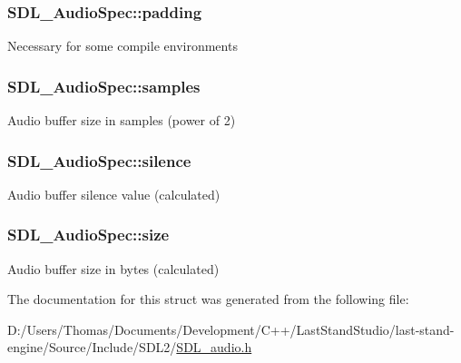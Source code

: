 \subsubsection[{padding}]{ S\+D\+L\+\_\+\+Audio\+Spec\+::padding}\label{structSDL__AudioSpec_a738371fc13b54cefef4db16994abeeb6}
Necessary for some compile environments \hypertarget{structSDL__AudioSpec_a2cdf5e885808c10bfa2810b706e69f95}{}
\subsubsection[{samples}]{ S\+D\+L\+\_\+\+Audio\+Spec\+::samples}\label{structSDL__AudioSpec_a2cdf5e885808c10bfa2810b706e69f95}
Audio buffer size in samples (power of 2) \hypertarget{structSDL__AudioSpec_addc462c8a806e6c122eccf63482048f6}{}
\subsubsection[{silence}]{ S\+D\+L\+\_\+\+Audio\+Spec\+::silence}\label{structSDL__AudioSpec_addc462c8a806e6c122eccf63482048f6}
Audio buffer silence value (calculated) \hypertarget{structSDL__AudioSpec_a154cf44743ecec78c36dc6c827dd2fdb}{}
\subsubsection[{size}]{ S\+D\+L\+\_\+\+Audio\+Spec\+::size}\label{structSDL__AudioSpec_a154cf44743ecec78c36dc6c827dd2fdb}
Audio buffer size in bytes (calculated) 

The documentation for this struct was generated from the following file\+:\begin{DoxyCompactItemize}
\item 
D\+:/\+Users/\+Thomas/\+Documents/\+Development/\+C++/\+Last\+Stand\+Studio/last-\/stand-\/engine/\+Source/\+Include/\+S\+D\+L2/\hyperlink{SDL__audio_8h}{S\+D\+L\+\_\+audio.\+h}\end{DoxyCompactItemize}
